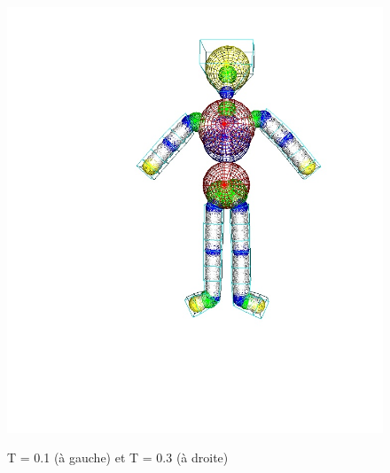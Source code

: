 \documentclass[9pt]{beamer}
\begin{document}
\begin{frame}
\begin{figure}[H]
{     		\includegraphics[scale=0.25]{images/sweeping2.jpg}
     		\hspace*{0.5cm}  
  		}
  		\caption{T = 0.1 (à gauche) et T = 0.3 (à droite)}
	\end{figure}
	
\end{frame}
\end{document}
